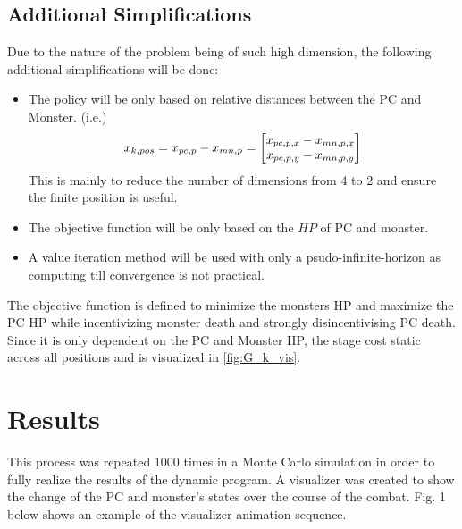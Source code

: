 \documentclass[letterpaper, 10 pt, conference]{ieeeconf}
\begin{document}
\subsection{Additional Simplifications}
Due to the nature of the problem being of such high dimension, the following additional simplifications will be done:
\begin{itemize}
    \item The policy will be only based on relative distances between the PC and Monster. (i.e.) \[
        x_{k,pos} = x_{pc,p} - x_{mn,p} = \mqty[x_{pc,p,x} - x_{mn,p,x}\\ x_{pc,p,y} - x_{mn,p,y}]
    \]
    This is mainly to reduce the number of dimensions from 4 to 2 and ensure the finite position is useful.
    \item The objective function will be only based on the $HP$ of PC and monster.
    \item A value iteration method will be used with only a psudo-infinite-horizon as computing till convergence is not practical.
\end{itemize}

The objective function is defined to minimize the monsters HP and maximize the PC HP while incentivizing monster death and strongly disincentivising PC death.
Since it is only dependent on the PC and Monster HP, the stage cost static across all positions and is visualized in \cref{fig:G_k_vis}.









\section{Results}
This process was repeated 1000 times in a Monte Carlo simulation in order to fully realize the results of the 
dynamic program. A visualizer was created to show the change of the PC and monster's states over the course of the 
combat. Fig. 1 below shows an example of the visualizer animation sequence.

\pagebreak
\end{document}
